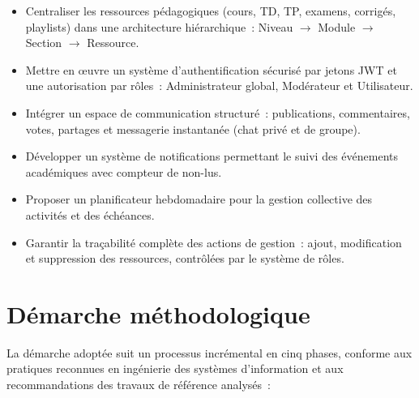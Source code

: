 \begin{itemize}
  \item[\textbf{OS1.}] Centraliser les ressources p\'edagogiques (cours, TD, TP, examens, corrig\'es, playlists) dans une architecture hi\'erarchique~: Niveau $\rightarrow$ Module $\rightarrow$ Section $\rightarrow$ Ressource.
  \item[\textbf{OS2.}] Mettre en \oe uvre un syst\`eme d'authentification s\'ecuris\'e par jetons JWT et une autorisation par r\^oles~: Administrateur global, Mod\'erateur et Utilisateur.
  \item[\textbf{OS3.}] Int\'egrer un espace de communication structur\'e~: publications, commentaires, votes, partages et messagerie instantan\'ee (chat priv\'e et de groupe).
  \item[\textbf{OS4.}] D\'evelopper un syst\`eme de notifications permettant le suivi des \'ev\'enements acad\'emiques avec compteur de non-lus.
  \item[\textbf{OS5.}] Proposer un planificateur hebdomadaire pour la gestion collective des activit\'es et des \'ech\'eances.
  \item[\textbf{OS6.}] Garantir la tra\c{c}abilit\'e compl\`ete des actions de gestion~: ajout, modification et suppression des ressources, contr\^ol\'ees par le syst\`eme de r\^oles.
\end{itemize}

\section{D\'emarche m\'ethodologique}
\label{sec:methodo}

La d\'emarche adopt\'ee suit un processus incr\'emental en cinq phases, conforme aux pratiques reconnues en ing\'enierie des syst\`emes d'information et aux recommandations des travaux de r\'ef\'erence analys\'es~:


